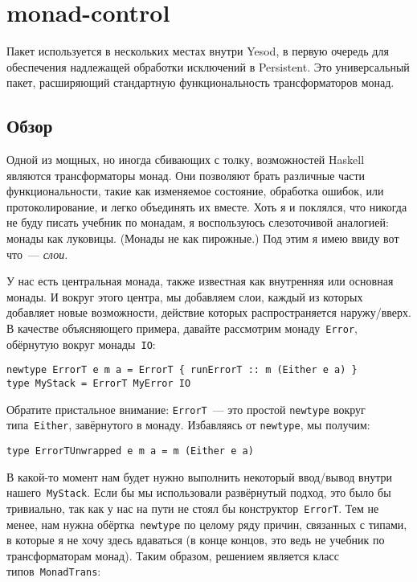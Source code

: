 \chapter{monad-control}\label{chap:monad-control}
Пакет
используется в нескольких местах внутри Yesod, в первую очередь для обеспечения
надлежащей обработки исключений в Persistent. Это универсальный пакет,
расширяющий стандартную функциональность трансформаторов монад.

\section{Обзор}
Одной из мощных, но иногда сбивающих с толку, возможностей Haskell являются
трансформаторы монад. Они позволяют брать различные части функциональности,
такие как изменяемое состояние, обработка ошибок, или протоколирование, и легко
объединять их вместе. Хоть я и поклялся, что никогда не буду писать учебник по
монадам, я воспользуюсь слезоточивой аналогией: монады как луковицы. (Монады
не как пирожные.) Под этим я имею ввиду вот что~--- \emph{слои}.

У нас есть центральная монада, также известная как внутренняя или основная
монады. И вокруг этого центра, мы добавляем слои, каждый из которых добавляет
новые возможности, действие которых распространяется наружу/вверх. В качестве
объясняющего примера, давайте рассмотрим монаду~\lstinline'Error', обёрнутую
вокруг монады~\lstinline'IO':

\begin{lstlisting}
newtype ErrorT e m a = ErrorT { runErrorT :: m (Either e a) }
type MyStack = ErrorT MyError IO
\end{lstlisting}

Обратите пристальное внимание: \lstinline'ErrorT'~--- это простой
\lstinline'newtype' вокруг типа~\lstinline'Either', завёрнутого в монаду.
Избавляясь от \lstinline'newtype', мы получим:

\begin{lstlisting}
type ErrorTUnwrapped e m a = m (Either e a)
\end{lstlisting}

В какой-то момент нам будет нужно выполнить некоторый ввод/вывод внутри
нашего~\lstinline'MyStack'.  Если бы мы использовали развёрнутый подход, это
было бы тривиально, так как у нас на пути не стоял бы
конструктор~\lstinline'ErrorT'. Тем не менее, нам нужна обёртка~\lstinline'newtype'
по целому ряду причин, связанных с типами, в которые я не хочу здесь
вдаваться (в конце концов, это ведь не учебник по трансформаторам монад). Таким
образом, решением является класс типов~\lstinline'MonadTrans':

